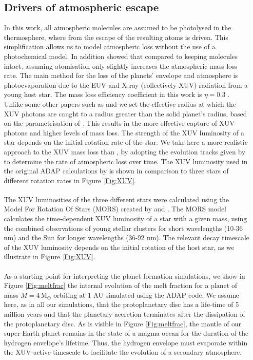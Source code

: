 \documentclass[bibyear,tradiabstract]{aa}
\begin{document}
\subsection{Drivers of atmospheric escape}
In this work, all atmospheric molecules are assumed to be photolysed in the thermosphere, where from the escape of the resulting atoms is driven. {This simplification allows us to model atmospheric loss without the use of a photochemical model. In addition \cite{Johansen+2023III} showed that compared to keeping molecules intact, assuming atomisation only slightly increases the atmospheric mass loss rate.} The main method for the loss of the planets' envelope and atmosphere is photoevaporation due to the EUV and X-ray (collectively XUV) radiation from a young host star. {The mass loss efficiency coefficient in this work is $\eta=0.3$ \citep{Salz+2016}. Unlike some other papers such as \cite{Luger&Barnes2015} and \cite{Aguichine+2021} we set the effective radius at which the XUV photons are caught to a radius greater than the solid planet's radius, based on the parametrisation of \cite{Salz+2016}. This results in the more effective capture of XUV photons and higher levels of mass loss.} The strength of the XUV luminosity of a star depends on the initial rotation rate of the star. We take here a more realistic approach to the XUV mass loss than \cite{Johansen+2023I}, by adopting the evolution tracks given by \cite{Johnstone+2021} to determine the rate of atmospheric loss over time. The XUV luminosity used in the original ADAP calculations by \cite{Johansen+2023I} is shown in comparison to three stars of different rotation rates in Figure \ref{Fig:XUV}. \\
\\
The XUV luminosities of the three different stars were calculated using the Model For Rotation Of Stars (MORS) created by \cite{Johnstone+2021} and \cite{Spada+2013}. The MORS model calculates the time-dependent XUV luminosity of a star with a given mass, using the combined observations of young stellar clusters for short wavelengths (10-36 nm) and the Sun for longer wavelengths (36-92 nm). The relevant decay timescale of the  XUV luminosity depends on the initial rotation of the host star, as we illustrate in Figure \ref{Fig:XUV}.\\
\\
As a starting point for interpreting the planet formation simulations, we show in Figure \ref{Fig:meltfrac} the internal evolution of the melt fraction for a planet of mass $M=4\,\mathrm{M}_{\oplus}$ orbiting at 1 AU simulated using the ADAP code. We assume here, as in all our simulations, that the protoplanetary disc has a life-time of 5 million years and that the planetary accretion terminates after the dissipation of the protoplanetary disc. As is visible in Figure \ref{Fig:meltfrac}, the mantle of our super-Earth planet remains in the state of a magma ocean for the duration of the hydrogen envelope's lifetime. Thus, the hydrogen envelope must evaporate within the XUV-active timescale to facilitate the evolution of a secondary atmosphere. \\
\end{document}
